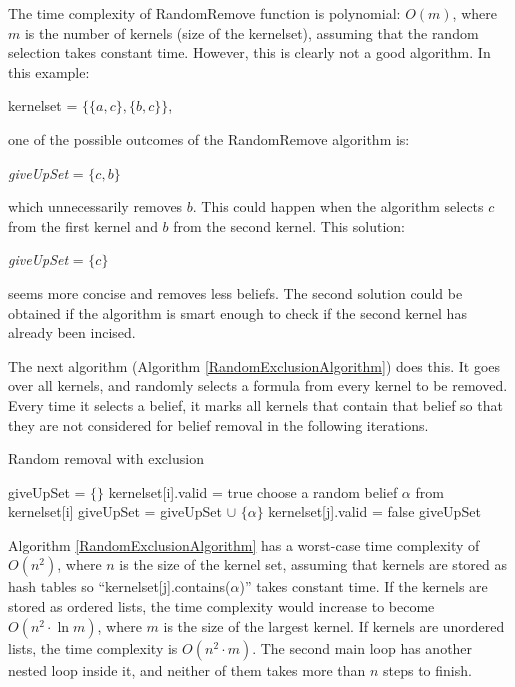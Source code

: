 The time complexity of RandomRemove function is polynomial: $O(m)$, where $m$ is the number of kernels (size of the kernelset), assuming that the random selection takes constant time. However, this is clearly not a good algorithm. In this example:
\begin{center}
kernelset = $\lbrace \lbrace a, c \rbrace, \lbrace b, c \rbrace \rbrace$, 
\end{center}
one of the possible outcomes of the RandomRemove algorithm is:
\begin{center}
\textit{giveUpSet} = $\lbrace c, b \rbrace$
\end{center}
which unnecessarily removes $b$. This could happen when the algorithm selects $c$ from the first kernel and $b$ from the second kernel. This solution:
\begin{center}
\textit{giveUpSet} = $\lbrace c \rbrace$
\end{center}
seems more concise and removes less beliefs. The second solution could be obtained if the algorithm is smart enough to check if the second kernel has already been incised. 

The next algorithm (Algorithm \ref{RandomExclusionAlgorithm}) does this. It goes over all kernels, and randomly selects a formula from every kernel to be removed. Every time it selects a belief, it marks all kernels that contain that belief so that they are not considered for belief removal in the following iterations. 

\begin{algorithm}
\caption{Random removal with exclusion}
\label{RandomExclusionAlgorithm}
\begin{algorithmic}[1]
\State giveUpSet = $\lbrace \rbrace$
\State kernelset[i].valid = true
\EndFor \State
{}
\State choose a random belief $\alpha$ from kernelset[i]
\State giveUpSet = giveUpSet $\cup$ $\lbrace \alpha \rbrace$
\State kernelset[j].valid = false
\EndIf
\EndFor
\EndIf
\EndFor \State
\Return giveUpSet
\EndFunction
\end{algorithmic}
\end{algorithm}

Algorithm \ref{RandomExclusionAlgorithm} has a worst-case time complexity of $O(n^2)$, where $n$ is the size of the kernel set, assuming that kernels are stored as hash tables so ``kernelset[j].contains($\alpha$)'' takes constant time. If the kernels are stored as ordered lists, the time complexity would increase to become $O(n^2 \cdot \ln m)$, where $m$ is the size of the largest kernel. If kernels are unordered lists, the time complexity is $O(n^2 \cdot m)$. The second main loop has another nested loop inside it, and neither of them takes more than $n$ steps to finish. 

